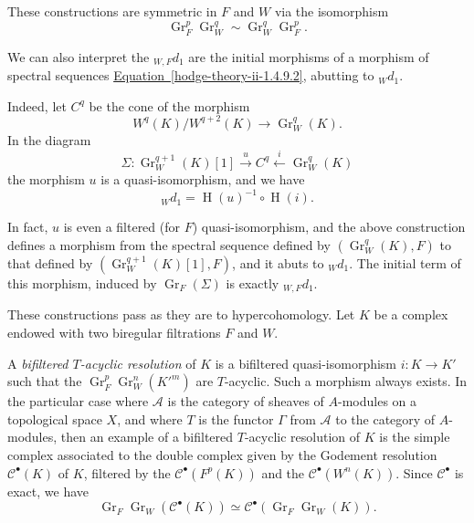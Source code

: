     
    These constructions are symmetric in \(F\) and \(W\) via the isomorphism
    \[       \operatorname {Gr}_F^p\operatorname {Gr}_W^q       \sim  \operatorname {Gr}_W^q\operatorname {Gr}_F^p.     \]\label{hodge-theory-ii-1.4.10}\par{}We can also interpret the \({}_{W,F}d_1\) are the initial morphisms of a morphism of spectral sequences \hyperref[hodge-theory-ii-1.4.9.2]{Equation~\ref*{hodge-theory-ii-1.4.9.2}}, abutting to \({}_Wd_1\).\par{}Indeed, let \(C^q\) be the cone of the morphism
    \[       W^q(K)/W^{q+2}(K) \to  \operatorname {Gr}_W^q(K).     \]
    In the diagram
    \[       \Sigma \colon  \operatorname {Gr}_W^{q+1}(K)[1]       \xrightarrow {u} C^q       \xleftarrow {i} \operatorname {Gr}_W^q(K)     \]
    the morphism \(u\) is a quasi-isomorphism, and we have
    \[       {}_Wd_1       = \operatorname {H}(u)^{-1}\circ \operatorname {H}(i).     \]\par{}In fact, \(u\) is even a filtered (for \(F\)) quasi-isomorphism, and the above construction defines a morphism from the spectral sequence defined by \((\operatorname {Gr}_W^q(K),F)\) to that defined by \((\operatorname {Gr}_W^{q+1}(K)[1],F)\), and it abuts to \({}_Wd_1\).
    The initial term of this morphism, induced by \(\operatorname {Gr}_F(\Sigma )\) is exactly \({}_{W,F}d_1\).\label{hodge-theory-ii-1.4.11}\par{}These constructions pass as they are to hypercohomology.
    Let \(K\) be a complex endowed with two biregular filtrations \(F\) and \(W\).\par{}A \emph{bifiltered \(T\)-acyclic resolution} of \(K\) is a bifiltered quasi-isomorphism \(i\colon  K\to  K'\) such that the \(\operatorname {Gr}_F^p\operatorname {Gr}_W^n({K'}^m)\) are \(T\)-acyclic.
    Such a morphism always exists.
    In the particular case where \(\mathscr {A}\) is the category of sheaves of \(A\)-modules on a topological space \(X\), and where \(T\) is the functor \(\Gamma \) from \(\mathscr {A}\) to the category of \(A\)-modules, then an example of a bifiltered \(T\)-acyclic resolution of \(K\) is the simple complex associated to the double complex given by the Godement resolution \(\mathscr {C}^\bullet (K)\) of \(K\), filtered by the \(\mathscr {C}^\bullet (F^p(K))\) and the \(\mathscr {C}^\bullet (W^n(K))\).
    Since \(\mathscr {C}^\bullet \) is exact, we have
    \[       \operatorname {Gr}_F\operatorname {Gr}_W(\mathscr {C}^\bullet (K))       \simeq  \mathscr {C}^\bullet (\operatorname {Gr}_F\operatorname {Gr}_W(K)).     \]

